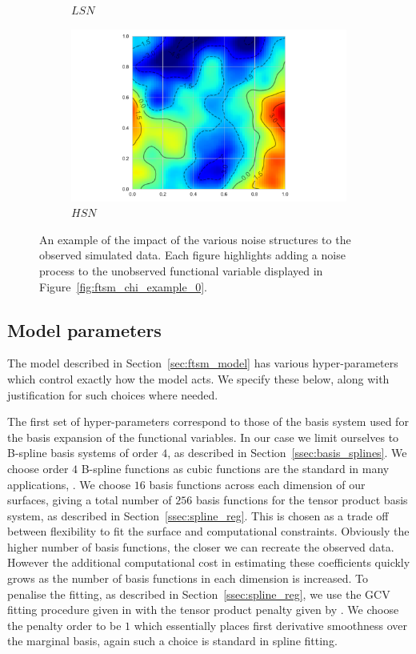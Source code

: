 \begin{figure}
\begin{subfigure}[b]{0.45\textwidth}
		\caption{$LSN$}
	\end{subfigure}
	\begin{subfigure}[b]{0.45\textwidth}
		\includegraphics[width=\textwidth]{sim_noise_example_hsn}
		\caption{$HSN$}
	\end{subfigure}  
	\caption[An example of the impact of noise to observed simulated data.]{An example of the impact of the various noise structures to the observed simulated data. Each figure highlights adding a noise process to the unobserved functional variable displayed in Figure~\ref{fig:ftsm_chi_example_0}.}
	\label{fig:ftsm_noise_example}
\end{figure}

\subsection{Model parameters \label{ssec:sim_params}}
The model described in Section~\ref{sec:ftsm_model} has various hyper-parameters which control exactly how the model acts.
We specify these  below, along with justification for such choices where needed.

The first set of hyper-parameters correspond to those of the basis system used for the basis expansion of the functional variables.
In our case we limit ourselves to B-spline basis systems of order $4$, as described in Section~\ref{ssec:basis_splines}.
We choose order $4$ B-spline functions as cubic functions are the standard in many applications, \citep{de_boor_practical_2001}. 
We choose $16$ basis functions across each dimension of our surfaces, giving a total number of $256$ basis functions for the tensor product basis system, as described in Section~\ref{ssec:spline_reg}. 
This is chosen as a trade off between flexibility to fit the surface and computational constraints. 
Obviously the higher number of basis functions, the closer we can recreate the observed data.
However the additional computational cost in estimating these coefficients quickly grows as the number of basis functions in each dimension is increased.
To penalise the fitting, as described in Section~\ref{ssec:spline_reg}, we use the GCV fitting procedure given in \citep{wahba_spline_1990} with the tensor product penalty given by \citep{wood_p-splines_2017}.
We choose the penalty order to be $1$ which essentially places first derivative smoothness over the marginal basis, again such a choice is standard in spline fitting. 

